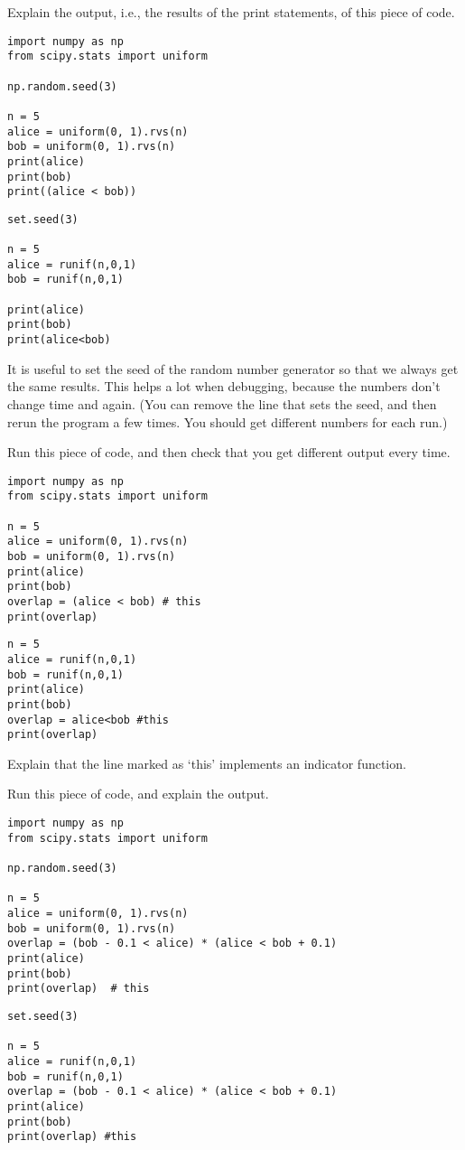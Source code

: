 \begin{exercise}
Explain the output, i.e., the results of the print statements, of this piece of code.
\begin{verbatim}
import numpy as np
from scipy.stats import uniform

np.random.seed(3)

n = 5
alice = uniform(0, 1).rvs(n)
bob = uniform(0, 1).rvs(n)
print(alice)
print(bob)
print((alice < bob))
\end{verbatim}

\begin{verbatim}
set.seed(3)

n = 5
alice = runif(n,0,1)
bob = runif(n,0,1)

print(alice)
print(bob)
print(alice<bob)
\end{verbatim}

It is useful to set the seed of the random number generator so that we always get the same results. This helps a lot when debugging, because the numbers don't change time and again. (You can remove the line that sets the seed, and then rerun the program a few times. You should get different numbers for each run.)
\end{exercise}

\begin{exercise}
Run  this piece of code, and then check that you get different output every time.
\begin{verbatim}
import numpy as np
from scipy.stats import uniform

n = 5
alice = uniform(0, 1).rvs(n)
bob = uniform(0, 1).rvs(n)
print(alice)
print(bob)
overlap = (alice < bob) # this
print(overlap)
\end{verbatim}

\begin{verbatim}
n = 5
alice = runif(n,0,1)
bob = runif(n,0,1)
print(alice)
print(bob)
overlap = alice<bob #this
print(overlap)
\end{verbatim}

Explain that the line marked as `this' implements an indicator function.
\end{exercise}


\begin{exercise}
Run  this piece of code, and explain the output.
\begin{verbatim}
import numpy as np
from scipy.stats import uniform

np.random.seed(3)

n = 5
alice = uniform(0, 1).rvs(n)
bob = uniform(0, 1).rvs(n)
overlap = (bob - 0.1 < alice) * (alice < bob + 0.1)
print(alice)
print(bob)
print(overlap)  # this
\end{verbatim}

\begin{verbatim}
set.seed(3)

n = 5
alice = runif(n,0,1)
bob = runif(n,0,1)
overlap = (bob - 0.1 < alice) * (alice < bob + 0.1)
print(alice)
print(bob)
print(overlap) #this
\end{verbatim}

\end{exercise}

